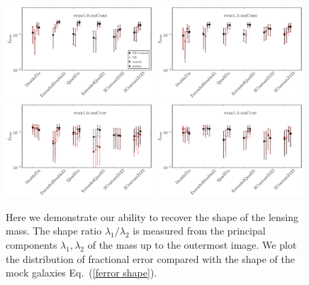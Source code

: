\documentclass[galley,usenatbib]{mn2e}
\newcommand{\eqnref}[1] {Eq.~(\ref{#1})}
\begin{document}
\begin{figure}
\includegraphics[width=0.49\textwidth]{AAferror_shape-1sig.pdf}
\includegraphics[width=0.49\textwidth]{BBferror_shape-1sig.pdf}\\
\includegraphics[width=0.49\textwidth]{ACferror_shape-1sig.pdf}
\includegraphics[width=0.49\textwidth]{BCferror_shape-1sig.pdf}
\caption{Here we demonstrate our ability to recover the shape of the lensing mass. The shape ratio
$\lambda_1/\lambda_2$ is measured from the principal components $\lambda_1, \lambda_2$ of the mass up to the outermost image.
We plot the distribution of fractional error compared with the shape of the mock galaxies \eqnref{ferror shape}.}
\label{shape results}
\end{figure}
\end{document}

